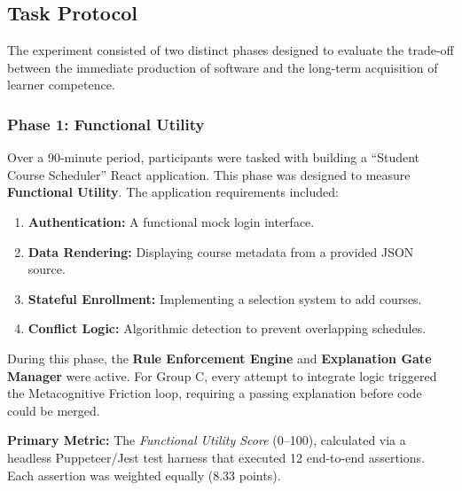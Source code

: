 \documentclass[sigconf]{acmart}
\begin{document}
\subsection{Task Protocol}
The experiment consisted of two distinct phases designed to evaluate the trade-off between the immediate production of software and the long-term acquisition of learner competence.

\subsubsection{Phase 1: Functional Utility}
Over a 90-minute period, participants were tasked with building a ``Student Course Scheduler'' React application. This phase was designed to measure \textbf{Functional Utility}. The application requirements included:
\begin{enumerate}
    \item \textbf{Authentication:} A functional mock login interface.
    \item \textbf{Data Rendering:} Displaying course metadata from a provided JSON source.
    \item \textbf{Stateful Enrollment:} Implementing a selection system to add courses.
    \item \textbf{Conflict Logic:} Algorithmic detection to prevent overlapping schedules.
\end{enumerate}

During this phase, the \textbf{Rule Enforcement Engine} and \textbf{Explanation Gate Manager} were active. For Group C, every attempt to integrate logic triggered the Metacognitive Friction loop, requiring a passing explanation before code could be merged. 

\textbf{Primary Metric:} The \textit{Functional Utility Score} (0–100), calculated via a headless Puppeteer/Jest test harness that executed 12 end-to-end assertions. Each assertion was weighted equally (8.33 points).
\end{document}
